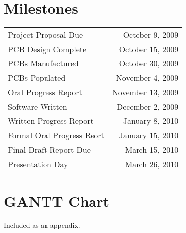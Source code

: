 \section{Milestones}

\begin{center}
  \begin{tabular}{|l|r|}
    \hline
    Project Proposal Due & October 9, 2009\\
    PCB Design Complete & October 15, 2009\\
    PCBs Manufactured & October 30, 2009\\
    PCBs Populated & November 4, 2009\\
    Oral Progress Report & November 13, 2009\\
    Software Written & December 2, 2009\\
    Written Progress Report & January 8, 2010\\
    Formal Oral Progress Reort & January 15, 2010\\
    Final Draft Report Due & March 15, 2010\\
    Presentation Day & March 26, 2010\\
    \hline
  \end{tabular}
\end{center}

\section{GANTT Chart}
Included as an appendix.
